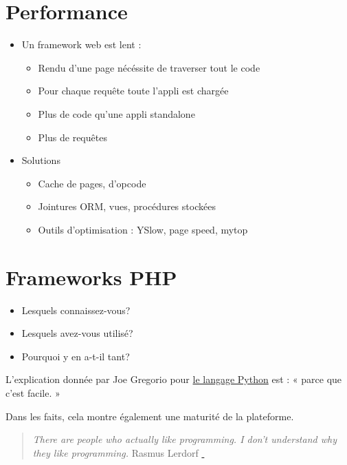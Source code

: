 \hypertarget{performance}{%
\section{Performance}\label{performance}}

\begin{itemize}
\tightlist
\item
  Un framework web est lent :

  \begin{itemize}
  \tightlist
  \item
    Rendu d'une page nécéssite de traverser tout le code
  \item
    Pour chaque requête toute l'appli est chargée
  \item
    Plus de code qu'une appli standalone
  \item
    Plus de requêtes
  \end{itemize}
\item
  Solutions

  \begin{itemize}
  \tightlist
  \item
    Cache de pages, d'opcode
  \item
    Jointures ORM, vues, procédures stockées
  \item
    Outils d'optimisation : YSlow, page speed, mytop
  \end{itemize}
\end{itemize}

\hypertarget{frameworks-php}{%
\section{Frameworks PHP}\label{frameworks-php}}

\begin{itemize}
\tightlist
\item
  Lesquels connaissez-vous?
\item
  Lesquels avez-vous utilisé?
\item
  Pourquoi y en a-t-il tant?
\end{itemize}

L'explication donnée par Joe Gregorio pour
\href{http://bitworking.org/news/Why_so_many_Python_web_frameworks}{le
langage Python} est : « parce que c'est facile. »

Dans les faits, cela montre également une maturité de la plateforme.

\begin{quote}
\emph{There are people who actually like programming. I don't understand
why they like programming.} Rasmus Lerdorf
\href{https://en.wikiquote.org/wiki/Rasmus_Lerdorf}{💬}
\end{quote}

